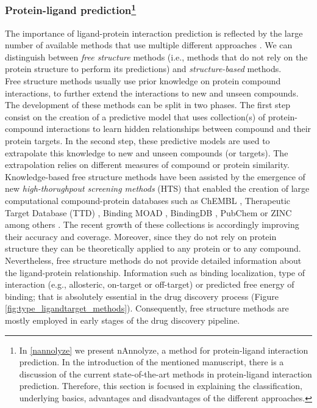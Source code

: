 \documentclass[11pt, b5paper,twoside]{tesi_upf}
\begin{document}
\subsubsection[Protein-ligand prediction]{Protein-ligand prediction\protect\footnote{In \cref{nannolyze} we present nAnnolyze, a method for protein-ligand interaction prediction. In the introduction of the mentioned manuscript, there is a discussion of the current state-of-the-art methods in protein-ligand interaction prediction. Therefore, this section is focused in explaining the classification, underlying basics, advantages and disadvantages of the different approaches.}}\label{prediction ligand-target}

The importance of ligand-protein interaction prediction is reflected by the large number of available methods that use multiple different approaches \cite{Csermely2013, prathipati2015}. We can distinguish between \textit{free structure} methods (i.e., methods that do not rely on the protein structure to perform its predictions) and \textit{structure-based} methods. \\    
Free structure methods usually use prior knowledge on protein compound interactions, to further extend the interactions to new and unseen compounds. The development of these methods can be split in two phases. The first step consist on the creation of a predictive model that uses collection(s) of protein-compound interactions to learn hidden relationships between compound and their protein targets.  In the second step, these predictive models are used to extrapolate this knowledge to new and unseen compounds (or targets). The extrapolation relies on different measures of compound or protein similarity. Knowledge-based free structure methods have been assisted by the emergence of new \textit{high-thorughpout screening methods} (HTS) that enabled the creation of large computational compound-protein databases such as ChEMBL \cite{Bento2014}, Therapeutic Target Database (TTD) \cite{Zhu2012a}, Binding MOAD \cite{Hu2005}, BindingDB \cite{Liu2007}, PubChem \cite{Kim2016, Wang2014} or ZINC among others \cite{Irwin2012}. The recent growth of these collections is accordingly improving their accuracy and coverage. Moreover, since they do not rely on protein structure they can be theoretically applied to any protein or to any compound. Nevertheless, free structure methods do not provide detailed information about the ligand-protein relationship. Information such as binding localization, type of interaction (e.g., allosteric, on-target or off-target) or predicted free energy of binding;  that is absolutely essential in the drug discovery process (Figure \ref{fig:type_ligandtarget_methods}). Consequently, free structure methods are mostly employed in early stages of the drug discovery pipeline. 
\end{document}
